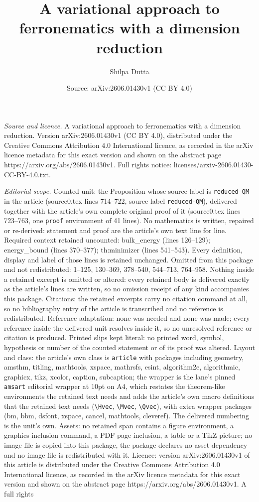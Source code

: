 \documentclass[10pt,a4paper]{amsart}
\title[A variational approach to ferronematics with a dimension red]{A variational approach to ferronematics with a dimension reduction}
\author{Shilpa Dutta}
\date{Source: arXiv:2606.01430v1 (CC BY 4.0)}
\begin{document}
\maketitle

\noindent\emph{Source and licence.} A variational approach to ferronematics with a dimension reduction. Version arXiv:2606.01430v1 (CC BY 4.0), distributed under the Creative Commons Attribution 4.0 International licence, as recorded in the arXiv licence metadata for this exact version and shown on the abstract page https://arxiv.org/abs/2606.01430v1. Full rights notice: licenses/arxiv-2606.01430-CC-BY-4.0.txt.\par\smallskip

\noindent\textit{Editorial scope.} Counted unit: the Proposition whose source label is \texttt{reduced-QM} in the article (source0.tex lines 714--722, source label \texttt{reduced-QM}), delivered together with the article's own complete original proof of it (source0.tex lines 723--763, one \texttt{proof} environment of 41 lines). No mathematics is written, repaired or re-derived: statement and proof are the article's own text line for line. Required context retained uncounted: bulk\_energy (lines 126--129); energy\_bound (lines 370--377); th:minimizer (lines 541--543). Every definition, display and label of those lines is retained unchanged. Omitted from this package and not redistributed: 1--125, 130--369, 378--540, 544--713, 764--958. Nothing inside a retained excerpt is omitted or altered: every retained body is delivered exactly as the article's lines are written, so no omission receipt of any kind accompanies this package. Citations: the retained excerpts carry no citation command at all, so no bibliography entry of the article is transcribed and no reference is redistributed. Reference adaptation: none was needed and none was made; every reference inside the delivered unit resolves inside it, so no unresolved reference or citation is produced. Printed slips kept literal: no printed word, symbol, hypothesis or number of the counted statement or of its proof was altered. Layout and class: the article's own class is \texttt{article} with packages including geometry, amsthm, titling, mathtools, xspace, mathrsfs, esint, algorithm2e, algorithmic, graphicx, tikz, xcolor, caption, subcaption; the wrapper is the lane's pinned \texttt{amsart} editorial wrapper at 10pt on A4, which restates the theorem-like environments the retained text needs and adds the article's own macro definitions that the retained text needs (\texttt{\textbackslash Hvec}, \texttt{\textbackslash Mvec}, \texttt{\textbackslash Qvec}), with extra wrapper packages (bm, bbm, dsfont, xspace, cancel, mathtools, cleveref). The delivered numbering is the unit's own. Assets: no retained span contains a figure environment, a graphics-inclusion command, a PDF-page inclusion, a table or a TikZ picture; no image file is copied into this package, the package declares no asset dependency and no image file is redistributed with it. Licence: version arXiv:2606.01430v1 of this article is distributed under the Creative Commons Attribution 4.0 International licence, as recorded in the arXiv licence metadata for this exact version and shown on the abstract page https://arxiv.org/abs/2606.01430v1. A full rights 
\end{document}
